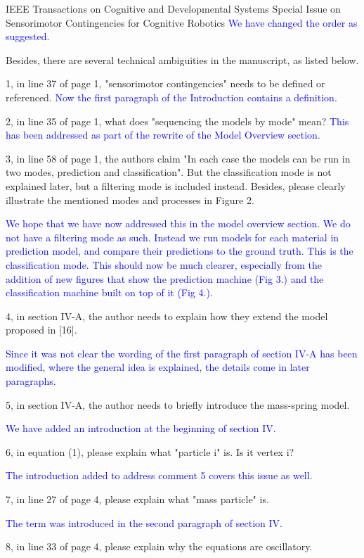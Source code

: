 \documentclass[a4paper,12pt]{letter}
\newcommand{\comment}[1]{\textcolor{blue}{#1}}
\begin{document}
\begin{letter}{IEEE Transactions on Cognitive and Developmental Systems\newline
Special Issue on Sensorimotor Contingencies for Cognitive Robotics}
\comment{We have changed the order as suggested.}

Besides, there are several technical ambiguities in the manuscript, as listed below. 

1, in line 37 of page 1, "sensorimotor contingencies" needs to be defined or referenced. 
\comment{Now the first paragraph of the Introduction contains a definition.}

2, in line 35 of page 1, what does "sequencing the models by mode" mean? 
\comment{This has been addressed as part of the rewrite of the Model Overview section.}

\newpage 

3, in line 58 of page 1, the authors claim "In each case the models can be run in two modes, prediction and classification". But the classification mode is not explained later, but a filtering mode is included instead. Besides, please clearly illustrate the mentioned modes and processes in Figure 2.

\comment{We hope that we have now addressed this in the model overview section. We do not have a filtering mode as such. Instead we run models for each material in prediction model, and compare their predictions to the ground truth. This is the classification mode. This should now be much clearer, especially from the addition of new figures that show the prediction machine (Fig 3.) and the classification machine built on top of it (Fig 4.).}

4, in section IV-A, the author needs to explain how they extend the model proposed in [16].

\comment{Since it was not clear the wording of the first paragraph of section IV-A has been modified, where the general idea is explained, the details come in later paragraphs.}

5, in section IV-A, the author needs to briefly introduce the mass-spring model.

\comment{We have added an introduction at the beginning of section IV.}

6, in equation (1), please explain what "particle i" is. Is it vertex i? 

\comment{The introduction added to address comment 5 covers this issue as well.}

7, in line 27 of page 4, please explain what "mass particle" is.

\comment{The term was introduced in the second paragraph of section IV.}

8, in line 33 of page 4, please explain why the equations are oscillatory.


\end{letter}
\end{document}
